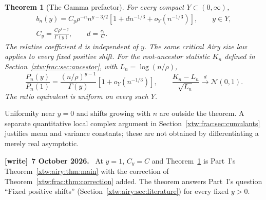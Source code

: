 \documentclass[11pt]{article}
\newtheorem{theorem}{Theorem}[section]
\theoremstyle{remark}\newtheorem{remark}[theorem]{Remark}
\newenvironment{writenote}[1][]{\par\smallskip\begingroup\small
 \noindent\textbf{[write]}\if\relax\detokenize{#1}\relax\else~\textbf{#1.}\fi\ }%
 {\par\endgroup\smallskip}
\begin{document}
\begin{theorem}[The Gamma prefactor]\label{xtw:frac:thm:family}
For every compact $Y\subset(0,\infty)$,
\begin{equation}\label{xtw:frac:eq:gammaprefactor}
 \begin{gathered}
 b_n(y)=C_y\rho^{-n}n^{y-3/2}\left[1+d n^{-1/3}+o_Y(n^{-1/3})\right],
 \qquad y\in Y,\\
 C_y=\frac{C\rho^{1-y}}{\Gamma(y)},\qquad d=\frac{c_1}{C}.
 \end{gathered}
\end{equation}
The relative coefficient $d$ is independent of $y$. The same critical Airy
size law applies to every fixed positive shift.
For the root-ancestor statistic $K_n$ defined in
Section~\ref{xtw:frac:sec:ancestor}, with $L_n=\log(n/\rho)$,
\begin{equation}\label{xtw:frac:eq:pgfclt}
 \frac{P_n(y)}{P_n(1)}=\frac{(n/\rho)^{y-1}}{\Gamma(y)}
                   [1+o_Y(n^{-1/3})],
 \qquad
 \frac{K_n-L_n}{\sqrt{L_n}}\xrightarrow{d}\mathcal N(0,1).
\end{equation}
The ratio equivalent is uniform on every such $Y$.
\end{theorem}
Uniformity near $y=0$ and shifts growing with $n$ are outside the theorem.
A separate quantitative local complex argument in Section~\ref{xtw:frac:sec:cumulants}
justifies mean and variance constants; these are not obtained by
differentiating a merely real asymptotic.
\begin{writenote}[7 October 2026]
At $y=1$, $C_y=C$ and Theorem~\ref{xtw:frac:thm:family} is Part~I's Theorem~\ref{xtw:airy:thm:main} with the correction of Theorem~\ref{xtw:frac:thm:correction} added. The theorem answers Part~I's question ``Fixed positive shifts'' (Section~\ref{xtw:airy:sec:literature}) for every fixed $y>0$.
\end{writenote}
\end{document}
